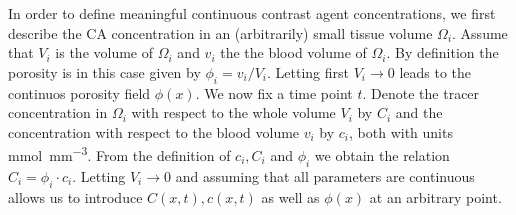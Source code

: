 \documentclass[paper=a4, fontsize=12pt,parskip=half,headings=small]{scrartcl}
\newcommand{\sic}{\milli\mol\per\cubic\milli\meter}
\begin{document}
	In order to define meaningful continuous contrast agent concentrations, we first describe the CA concentration in an (arbitrarily) small tissue volume $\Omega_i$.
	Assume that $V_i$ is the volume of $\Omega_i$ and $v_i$ the the blood volume of $\Omega_i$.
	By definition the porosity is in this case given by $\phi_i = v_i/V_i$.
	Letting first $V_i \rightarrow 0$ leads to the continuos porosity field $\phi(x)$.	
	We now fix a time point $t$.
	Denote the tracer concentration in $\Omega_i$ with respect to the whole volume $V_i$ by $C_i$ and the concentration with respect to the blood volume $v_i$ by $c_i$, both with units \si{\sic}. 
	From the definition of $c_i,C_i$ and $\phi_i$ we obtain the relation $C_i = \phi_i \cdot c_i$.
	Letting $V_i \to 0$ and assuming that all parameters are continuous allows us to introduce $C(x,t),c(x,t)$ as well as $\phi(x)$ at an arbitrary point.
\end{document}
